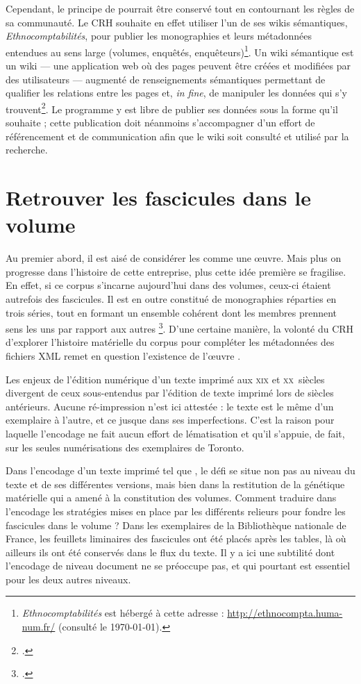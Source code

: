 Cependant, le principe de \wikisource{} pourrait être conservé tout en contournant les règles de sa communauté. Le CRH souhaite en effet utiliser l'un de ses wikis sémantiques, \textit{Ethnocomptabilités}, pour publier les monographies et leurs métadonnées entendues au sens large (volumes, enquêtés, enquêteurs)\footnote{\textit{Ethnocomptabilités} est hébergé à cette adresse : \url{http://ethnocompta.huma-num.fr/} (consulté le \today).}. Un wiki sémantique est un wiki --- \cad{} une application web où des pages peuvent être créées et modifiées par des utilisateurs --- augmenté de renseignements sémantiques permettant de qualifier les relations entre les pages et, \textit{in fine}, de manipuler les données qui s'y trouvent\footcite{poupeau}. Le programme \timeus{} y est libre de publier ses données sous la forme qu'il souhaite ; cette publication doit néanmoins s'accompagner d'un effort de référencement et de communication afin que le wiki soit consulté et utilisé par la recherche.

\section{Retrouver les fascicules dans le volume}

Au premier abord, il est aisé de considérer les \odm{} comme une \oe{}uvre. Mais plus on progresse dans l'histoire de cette entreprise, plus cette idée première se fragilise. En effet, si ce corpus s'incarne aujourd'hui dans des volumes, ceux-ci étaient autrefois des fascicules. Il est en outre constitué de monographies réparties en trois séries, tout en formant un ensemble cohérent dont les membres \og prennent sens les uns par rapport aux autres \fg{}\footcite[p. 5]{chenu}. D'une certaine manière, la volonté du CRH d'explorer l'histoire matérielle du corpus pour compléter les métadonnées des fichiers XML remet en question l'existence de \og l'\oe{}uvre \odm{} \fg{}.

Les enjeux de l'édition numérique d'un texte imprimé aux \textsc{xix}\ieme{} et \textsc{xx}\ieme~siècles divergent de ceux sous-entendus par l'édition de texte imprimé lors de siècles antérieurs. Aucune ré-impression n'est ici attestée : le texte est le même d'un exemplaire à l'autre, et ce jusque dans ses imperfections. C'est la raison pour laquelle l'encodage ne fait aucun effort de lématisation et qu'il s'appuie, de fait, sur les seules numérisations des exemplaires de Toronto.

Dans l'encodage d'un texte imprimé tel que \lodm{}, le défi se situe non pas au niveau du texte et de ses différentes versions, mais bien dans la restitution de la génétique matérielle qui a amené à la constitution des volumes. Comment traduire dans l'encodage les stratégies mises en place par les différents relieurs pour fondre les fascicules dans le volume ? Dans les exemplaires de la Bibliothèque nationale de France, les feuillets liminaires des fascicules ont été placés après les tables, là où ailleurs ils ont été conservés dans le flux du texte. Il y a ici une subtilité dont l'encodage de niveau \og document \fg{} ne se préoccupe pas, et qui pourtant est essentiel pour les deux autres niveaux.


